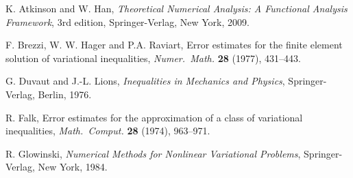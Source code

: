 \documentclass[12pt]{article}
\begin{document}
\begin{thebibliography}{10}

 K. Atkinson and W. Han, \emph{Theoretical Numerical
Analysis: A Functional Analysis Framework}, 3rd edition,
Springer-Verlag, New York, 2009.

%


F. Brezzi, W. W. Hager and P.A. Raviart, Error estimates for the finite element solution of
variational inequalities, \emph{Numer.\ Math.} {\bf 28} (1977), 431--443.

G. Duvaut and J.-L. Lions, \emph{Inequalities in Mechanics and
Physics}, Springer-Verlag, Berlin, 1976.

R. Falk, Error estimates for the approximation of a class of variational inequalities, 
\emph{Math.\ Comput.} {\bf 28} (1974), 963--971.

 R. Glowinski, \emph{Numerical Methods for Nonlinear
Variational Problems}, Springer-Verlag, New York, 1984.







\end{thebibliography}
\end{document}

